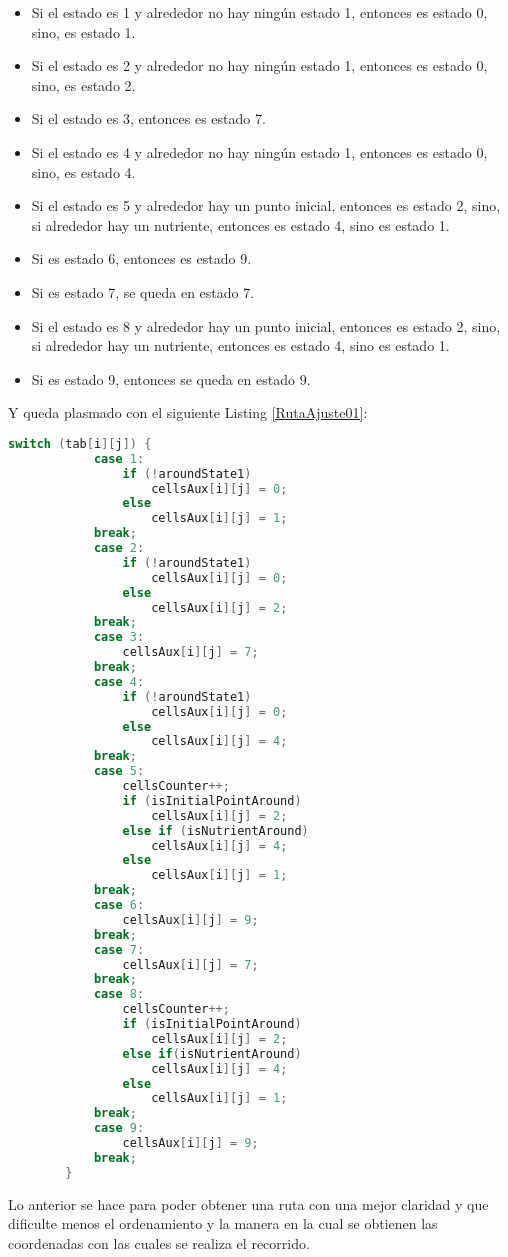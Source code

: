     \begin{itemize}
        \item Si el estado es 1 y alrededor no hay ning\'un estado 1, entonces es estado 0, sino, es estado 1.
        \item Si el estado es 2 y alrededor no hay ning\'un estado 1, entonces es estado 0, sino, es estado 2.
        \item Si el estado es 3, entonces es estado 7.
        \item Si el estado es 4 y alrededor no hay ning\'un estado 1, entonces es estado 0, sino, es estado 4.
        \item Si el estado es 5 y alrededor hay un punto inicial, entonces es estado 2, sino, si alrededor hay un nutriente, entonces es estado 4, sino es estado 1.
        \item Si es estado 6, entonces es estado 9.
        \item Si es estado 7, se queda en estado 7.
        \item Si el estado es 8 y alrededor hay un punto inicial, entonces es estado 2, sino, si alrededor hay un nutriente, entonces es estado 4, sino es estado 1.
        \item Si es estado 9, entonces se queda en estado 9.
    \end{itemize}
    \vskip 0.5cm    
    Y queda plasmado con el siguiente Listing \ref{RutaAjuste01}:
    \vskip 0.5cm
    \begin{lstlisting}[language={C++}, caption={Ruta Ajuste 1}, label={RutaAjuste01}]
        switch (tab[i][j]) {
            case 1:
                if (!aroundState1)
                    cellsAux[i][j] = 0;
                else
                    cellsAux[i][j] = 1;
            break;
            case 2:
                if (!aroundState1)
                    cellsAux[i][j] = 0;
                else
                    cellsAux[i][j] = 2;
            break;
            case 3:
                cellsAux[i][j] = 7;
            break;
            case 4:
                if (!aroundState1)
                    cellsAux[i][j] = 0;
                else
                    cellsAux[i][j] = 4;
            break;
            case 5:
                cellsCounter++;
                if (isInitialPointAround)
                    cellsAux[i][j] = 2;
                else if (isNutrientAround)
                    cellsAux[i][j] = 4;
                else
                    cellsAux[i][j] = 1;
            break;
            case 6:
                cellsAux[i][j] = 9;
            break;
            case 7:
                cellsAux[i][j] = 7;
            break;
            case 8:
                cellsCounter++;
                if (isInitialPointAround)
                    cellsAux[i][j] = 2;
                else if(isNutrientAround)
                    cellsAux[i][j] = 4;
                else
                    cellsAux[i][j] = 1;
            break;
            case 9:
                cellsAux[i][j] = 9;
            break;
        }
    \end{lstlisting}
\vskip 0.5cm
    Lo anterior se hace para poder obtener una ruta con una
        mejor claridad y que dificulte menos el ordenamiento y la
        manera en la cual se obtienen las coordenadas con las cuales
        se realiza el recorrido.